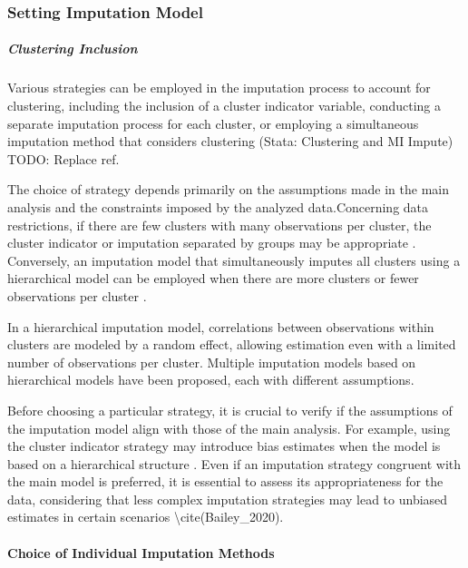 \documentclass[
]{jss}
\begin{document}
\hypertarget{setting-imputation-model}{%
\subsubsection{Setting Imputation
Model}\label{setting-imputation-model}}

\hypertarget{clustering-inclusion}{%
\subparagraph{Clustering Inclusion}\label{clustering-inclusion}}

Various strategies can be employed in the imputation process to account
for clustering, including the inclusion of a cluster indicator variable,
conducting a separate imputation process for each cluster, or employing
a simultaneous imputation method that considers clustering (Stata:
Clustering and MI Impute) TODO: Replace ref.

The choice of strategy depends primarily on the assumptions made in the
main analysis and the constraints imposed by the analyzed
data.Concerning data restrictions, if there are few clusters with many
observations per cluster, the cluster indicator or imputation separated
by groups may be appropriate \cite{Graham_2009}. Conversely, an
imputation model that simultaneously imputes all clusters using a
hierarchical model can be employed when there are more clusters or fewer
observations per cluster \cite{Allison_2002}.

In a hierarchical imputation model, correlations between observations
within clusters are modeled by a random effect, allowing estimation even
with a limited number of observations per cluster. Multiple imputation
models based on hierarchical models have been proposed, each with
different assumptions.

Before choosing a particular strategy, it is crucial to verify if the
assumptions of the imputation model align with those of the main
analysis. For example, using the cluster indicator strategy may
introduce bias estimates when the model is based on a hierarchical
structure \cite{Taaljard_2008}. Even if an imputation strategy congruent
with the main model is preferred, it is essential to assess its
appropriateness for the data, considering that less complex imputation
strategies may lead to unbiased estimates in certain scenarios
\textbackslash cite(Bailey\_2020).

\hypertarget{choice-of-individual-imputation-methods}{%
\paragraph{Choice of Individual Imputation
Methods}\label{choice-of-individual-imputation-methods}}
\end{document}
